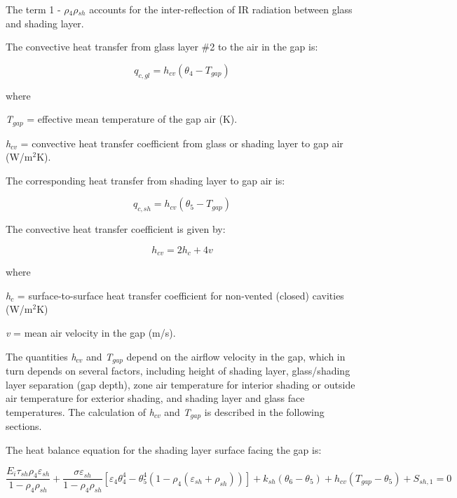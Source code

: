 The term 1 - \emph{$\rho$\(_{4}\)$\rho$\(_{sh}\)} accounts for the inter-reflection of IR radiation between glass and shading layer.

The convective heat transfer from glass layer \#2 to the air in the gap is:

\begin{equation}
{q_{c,gl}} = {h_{cv}}({\theta_4} - {T_{gap}})
\end{equation}

where

\emph{T\(_{gap}\)} = effective mean temperature of the gap air (K).

\emph{h\(_{cv}\)} = convective heat transfer coefficient from glass or shading layer to gap air (W/m\(^{2}\)K).

The corresponding heat transfer from shading layer to gap air is:

\begin{equation}
{q_{c,sh}} = {h_{cv}}({\theta_5} - {T_{gap}})
\end{equation}

The convective heat transfer coefficient is given by:

\begin{equation}
{h_{cv}} = 2{h_c} + 4v
\label{eq:hcvConvectiveCoefficientEquation}
\end{equation}

where

\emph{h\(_{c}\)} = surface-to-surface heat transfer coefficient for non-vented (closed) cavities (W/m\(^{2}\)K)

\emph{v} = mean air velocity in the gap (m/s).

The quantities \emph{h\(_{cv}\)} and \emph{T\(_{gap}\)} depend on the airflow velocity in the gap, which in turn depends on several factors, including height of shading layer, glass/shading layer separation (gap depth), zone air temperature for interior shading or outside air temperature for exterior shading, and shading layer and glass face temperatures. The calculation of \emph{h\(_{cv}\)} and \emph{T\(_{gap}\)} is described in the following sections.

The heat balance equation for the shading layer surface facing the gap is:

\begin{equation}
\frac{E_i \tau_{sh} \rho_4 \varepsilon_{sh}} {1 - \rho_4 \rho_{sh}} + 
  \frac{\sigma \varepsilon_{sh}} {1 - \rho_4 \rho_{sh}} \left[
    \varepsilon_4 \theta_4^4 - \theta_5^4 (
      1 - \rho_4( 
        \varepsilon_{sh} + \rho_{sh}
      )
    )
  \right] + 
  k_{sh} \left(
    \theta_6 - \theta_5
  \right) + 
  h_{cv} \left(
    T_{gap} - \theta_5
  \right) + 
  S_{sh,1} = 0
\end{equation}


